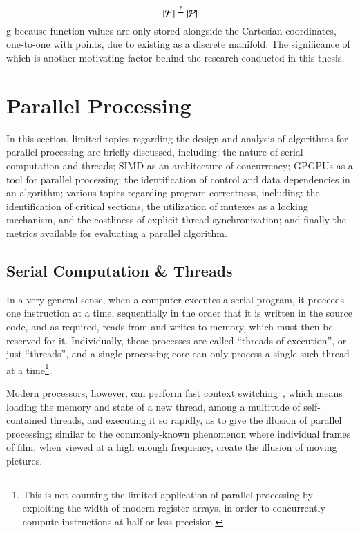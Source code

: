 \begin{equation}
	|\mathcal{F}| \overset{!}{=} |\mathcal{P}|
\end{equation}
g
because function values are only stored alongside the Cartesian coordinates, one-to-one with points, due to \tdd{} existing as a discrete manifold. The significance of which is another motivating factor behind the research conducted in this thesis.

%
%
%
%
%
%
\section{Parallel Processing}
\label{ch2sPP}
In this section, limited topics regarding the design and analysis of algorithms for parallel processing are briefly discussed, including: the nature of serial computation and threads; \gls{SIMD} as an architecture of concurrency; \glspl{GPGPU} as a tool for parallel processing; the identification of control and data dependencies in an algorithm; various topics regarding program correctness, including: the identification of critical sections, the utilization of mutexes as a locking mechanism, and the costliness of explicit thread synchronization; and finally the metrics available for evaluating a parallel algorithm.

%
%
%
%
\subsection{Serial Computation \& Threads}
\label{ch2sPPssSCT}
In a very general sense, when a computer executes a serial program, it proceeds one instruction at a time, sequentially in the order that it is written in the source code, and as required, reads from and writes to memory, which must then be reserved for it. Individually, these processes are called ``threads of execution'', or just ``\glspl{thread}'', and a single processing core can only process a single such thread at a time\footnote{This is not counting the limited application of parallel processing by exploiting the width of modern register arrays, in order to concurrently compute instructions at half or less precision.}.

Modern processors, however, can perform fast context switching~\cite{Silberschatz10}, which means loading the memory and state of a new thread, among a multitude of self-contained threads, and executing it so rapidly, as to give the illusion of parallel processing; similar to the commonly-known phenomenon where individual frames of film, when viewed at a high enough frequency, create the illusion of moving pictures.

